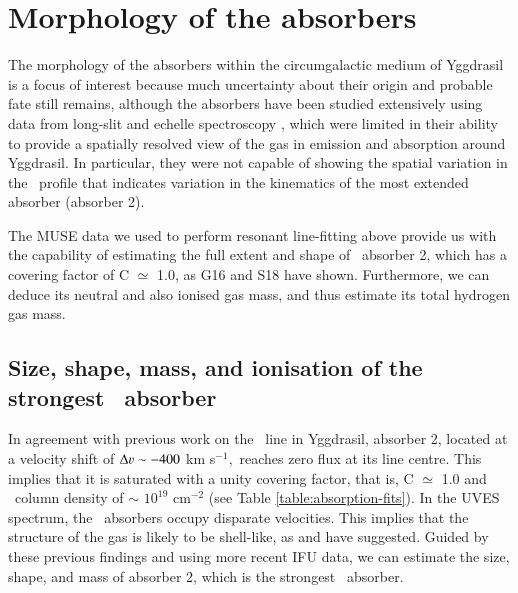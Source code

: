 \section{Morphology of the absorbers}\label{section:morphology-absorbers}
The morphology of the absorbers within the circumgalactic medium of Yggdrasil is a focus of interest because much uncertainty about their origin and probable fate still remains, although the absorbers have been studied extensively using data from long-slit \citep[i.e.][]{rottgering1995,vanojik1997} and echelle spectroscopy \citep[i.e.][]{jarvis2003,wilman2004}, which were limited in their ability to provide a spatially resolved view of the gas in emission and absorption around Yggdrasil. In particular, they were not capable of showing the spatial variation in the \lya~profile that indicates variation in the kinematics of the most extended absorber (absorber 2). 

The MUSE data we used to perform resonant line-fitting above provide us with the capability of estimating the full extent and shape of \lya~absorber 2, which has a covering factor of C $\simeq$ 1.0, as G16 and S18 have shown. Furthermore, we can deduce its neutral and also ionised gas mass, and thus estimate its total hydrogen gas mass. 

\subsection{Size, shape, mass, and ionisation of the strongest \lya~absorber}\label{section:morphology}

In agreement with previous work on the \lya~line in Yggdrasil, absorber 2, located at a velocity shift of $\Delta \varv \sim-400$ km s$^{-1},$ reaches zero flux at its line centre. This implies that it is saturated with a unity covering factor, that is, C $\simeq$ 1.0 and \lya~column density of $\sim$ $10^{19}$ cm$^{-2}$ (see Table \ref{table:absorption-fits}). In the UVES spectrum, the \lya~absorbers occupy disparate velocities. This implies that the structure of the  gas is likely to be shell-like, as \citet{binette2000} and \citet{jarvis2003} have suggested. Guided by these previous findings and using more recent IFU data, we can estimate the size, shape, and mass of absorber 2, which is the strongest \lya~absorber. 

